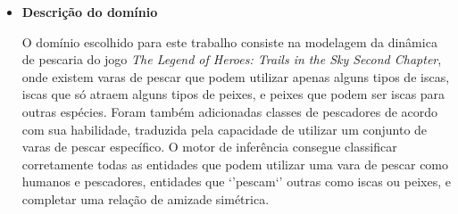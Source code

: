 \documentclass{article}
\begin{document}
\begin{itemize}
    \item \textbf{Descrição do domínio}

        O domínio escolhido para este trabalho consiste na modelagem da
        dinâmica de pescaria do jogo \emph{The Legend of Heroes: Trails in the
        Sky Second Chapter}, onde existem varas de pescar que podem utilizar
        apenas alguns tipos de iscas, iscas que só atraem alguns tipos de
        peixes, e peixes que podem ser iscas para outras espécies. Foram
        também adicionadas classes de pescadores de acordo com sua habilidade,
        traduzida pela capacidade de utilizar um conjunto de varas de pescar
        específico. O motor de inferência consegue classificar corretamente
        todas as entidades que podem utilizar uma vara de pescar como humanos
        e pescadores, entidades que `'pescam`' outras como iscas ou peixes,
        e completar uma relação de amizade simétrica.

\end{itemize}



\end{document}
